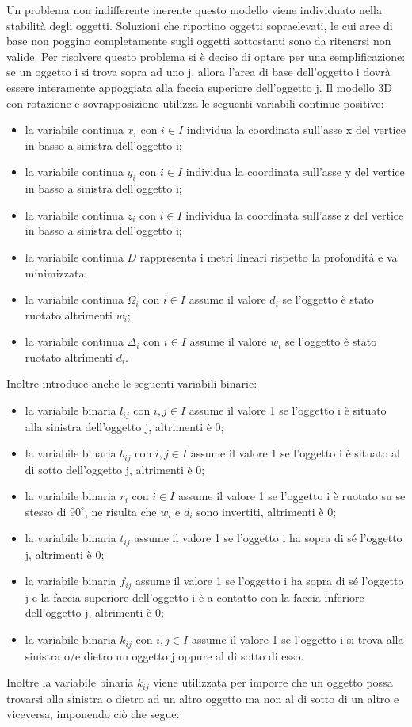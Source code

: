 Un problema non indifferente inerente questo modello viene individuato nella stabilità degli oggetti. 
Soluzioni che riportino oggetti sopraelevati, le cui aree di base non poggino completamente sugli oggetti sottostanti sono da ritenersi non valide. Per risolvere questo problema si è deciso di optare per una semplificazione: se un oggetto i si trova sopra ad uno j, allora l'area di base dell'oggetto i dovrà essere interamente appoggiata alla faccia superiore dell'oggetto j.
\newpage
Il modello 3D con rotazione e sovrapposizione utilizza le seguenti variabili continue positive:
\begin{itemize}
	\item la variabile continua $x_{i}$ con $i \in I$ individua la coordinata sull'asse x del vertice in basso a sinistra dell'oggetto i;
	\item la variabile continua $y_{i}$ con $i \in I$ individua la coordinata sull'asse y del vertice in basso a sinistra dell'oggetto i;
	\item la variabile continua $z_{i}$ con $i \in I$ individua la coordinata sull'asse z del vertice in basso a sinistra dell'oggetto i;
	\item la variabile continua $D$ rappresenta i metri lineari rispetto la profondità e va minimizzata;
	\item la variabile continua $\Omega_{i}$ con $i \in I$ assume il valore $d_i$ se l'oggetto è stato ruotato altrimenti $w_i$;
	\item la variabile continua $\Delta_{i}$ con $i \in I$ assume il valore $w_i$ se l'oggetto è stato ruotato altrimenti $d_i$.
\end{itemize}
Inoltre introduce anche le seguenti variabili binarie:
\begin{itemize}
	\item la variabile binaria $l_{ij}$ con $i,j \in I$ assume il valore 1 se l'oggetto i è situato alla sinistra dell'oggetto j, altrimenti è 0;
	\item la variabile binaria $b_{ij}$ con $i,j \in I$ assume il valore 1 se l'oggetto i è situato al di sotto dell'oggetto j, altrimenti è 0;
	\item la variabile binaria $r_{i}$ con $i \in I$ assume il valore 1 se l'oggetto i è ruotato su se stesso di $90^{\circ}$, ne risulta che $w_{i}$ e $d_{i}$ sono invertiti, altrimenti è 0;
	\item la variabile binaria $t_{ij}$ assume il valore 1 se l'oggetto i ha sopra di sé l'oggetto j, altrimenti è 0;
	\item la variabile binaria $f_{ij}$ assume il valore 1 se l'oggetto i ha sopra di sé l'oggetto j e la faccia superiore dell'oggetto i è a contatto con la faccia inferiore dell'oggetto j, altrimenti è 0;
	\item la variabile binaria $k_{ij}$ con $i,j \in I$ assume il valore 1 se l'oggetto i si trova alla sinistra o/e dietro un oggetto j oppure al di sotto di esso. 
\end{itemize}
\newpage
Inoltre la variabile binaria $k_{ij}$ viene utilizzata per imporre che un oggetto possa trovarsi alla sinistra o dietro ad un altro oggetto ma non al di sotto di un altro e viceversa, imponendo ciò che segue:

